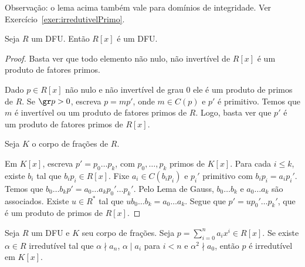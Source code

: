     Observação: o lema acima também vale para domínios de integridade. Ver Exercício~\ref{exer:irredutivelPrimo}.
    \begin{prop}
        Seja $R$ um DFU. Então $R[x]$ é um DFU.
    \end{prop}
    \begin{proof}
        Basta ver que todo elemento não nulo, não invertível de $R[x]$ é um produto de fatores primos.

        Dado $p \in R[x]$ não nulo e não invertível de grau $0$ ele é um produto de primos de $R$. Se $\gr p>0$, escreva $p=mp'$, onde $m \in C(p)$ e $p'$ é primitivo. Temos que $m$ é invertível ou um produto de fatores primos de $R$. Logo, basta ver que $p'$ é um produto de fatores primos de $R[x]$.

        Seja $K$ o corpo de frações de $R$.

        Em $K[x]$, escreva $p'=p_0\dots p_k$, com $p_0,\dots, p_k$ primos de $K[x]$. Para cada $i\leq k$, existe $b_i$ tal que $b_i p_i\in R[x]$.
        Fixe $a_i \in C(b_ip_i)$ e $p_i'$ primitivo com $b_ip_i=a_ip_i'$. Temos que $b_0 \dots b_k p'= a_0\dots a_k p_0'\dots p_k'$. Pelo Lema de Gauss, $b_0 \dots b_k$ e $a_0\dots a_k$ são associados. Existe $u \in R^*$  tal que $u b_0 \dots b_k= a_0\dots a_k$. Segue que $p'=up_0'\dots p_k'$, que é um produto de primos de $R[x]$.
    \end{proof}

     \begin{theorem}
        Seja $R$ um DFU e $K$ seu corpo de frações. Seja $p=\sum_{i=0}^n a_ix^i \in R[x]$. Se existe $\alpha \in R$ irredutível tal que $\alpha\nmid a_n$, $\alpha \mid a_i$ para $i<n$ e $\alpha^2\nmid a_0$, então $p$ é irredutível em $K[x]$.
    \end{theorem}

